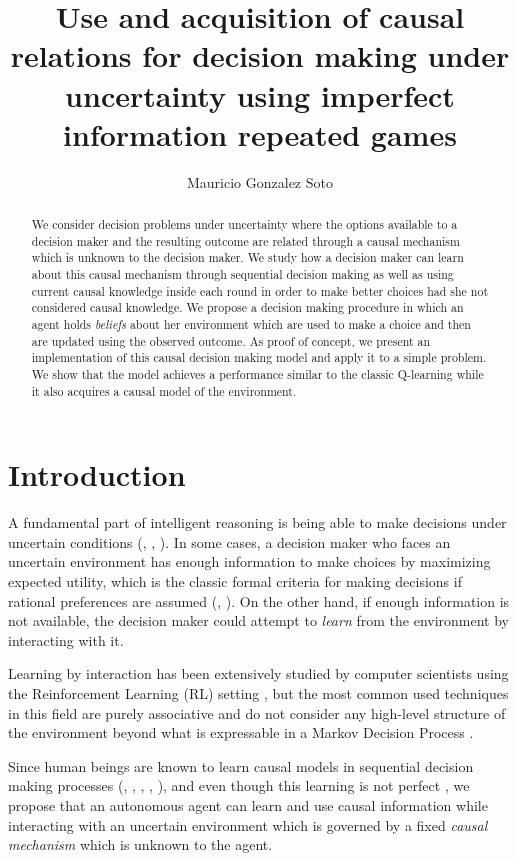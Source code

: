 \documentclass[11pt]{article}
\title{Use and acquisition of causal relations for decision making under uncertainty using imperfect information repeated games}
\author{Mauricio Gonzalez Soto}
\theoremstyle{plain}
\begin{document}
\maketitle
\tableofcontents
\newpage
\begin{abstract}
We consider decision problems under uncertainty where the options available to a decision maker and the resulting outcome are related through a causal mechanism which is unknown to the decision maker. We study how a decision maker can learn about this causal mechanism through sequential decision making as well as using current causal knowledge inside each round in order to make better choices had she not considered causal knowledge. We propose a decision making procedure in which an agent holds \textit{beliefs} about her environment which are used to make a choice and then are updated using the observed outcome. As proof of concept, we present an implementation of this causal decision making model and apply it to a simple problem. We show that the model achieves a performance similar to the classic Q-learning while it also acquires a causal model of the environment. 
\end{abstract}
\section{Introduction}
\indent A fundamental part of intelligent reasoning is being able to make decisions under uncertain conditions (\cite{danks2014unifying}, \cite{lake2017building}, \cite{pearlwhy}). In some cases, a decision maker who faces an uncertain environment has enough information to make choices by maximizing expected utility, which is the classic formal criteria for making decisions if rational preferences are assumed (\cite{bernardo2000bayesian}, \cite{gilboa2009decision}). On the other hand, if enough information is not available, the decision maker could attempt to \textit{learn} from the environment by interacting with it.

Learning by interaction has been extensively studied by computer scientists using the Reinforcement Learning (RL) setting \cite{sutton1998reinforcement}, but the most common used techniques  in this field are purely associative and do not consider any high-level structure of the environment beyond what is expressable in a Markov Decision Process \cite{garnelo2016towards}.

Since human beings are known to learn causal models in sequential decision making processes (\cite{sloman2006causal}, \cite{nichols2007decision}, \cite{meder2010observing}, \cite{hagmayer2013repeated}, \cite{danks2014unifying}), and even though this learning is not perfect \cite{rottman2014reasoning}, we propose that an autonomous agent can learn and use causal information while interacting with an uncertain environment which is governed by a fixed \textit{causal mechanism} which is unknown to the agent.  
\end{document}
